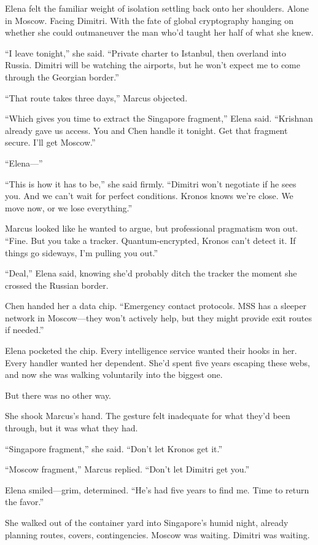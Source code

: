 \documentclass[12pt,letterpaper]{book}
\begin{document}
Elena felt the familiar weight of isolation settling back onto her shoulders. Alone in Moscow. Facing Dimitri. With the fate of global cryptography hanging on whether she could outmaneuver the man who'd taught her half of what she knew.

``I leave tonight,'' she said. ``Private charter to Istanbul, then overland into Russia. Dimitri will be watching the airports, but he won't expect me to come through the Georgian border.''

``That route takes three days,'' Marcus objected.

``Which gives you time to extract the Singapore fragment,'' Elena said. ``Krishnan already gave us access. You and Chen handle it tonight. Get that fragment secure. I'll get Moscow.''

``Elena---''

``This is how it has to be,'' she said firmly. ``Dimitri won't negotiate if he sees you. And we can't wait for perfect conditions. Kronos knows we're close. We move now, or we lose everything.''

Marcus looked like he wanted to argue, but professional pragmatism won out. ``Fine. But you take a tracker. Quantum-encrypted, Kronos can't detect it. If things go sideways, I'm pulling you out.''

``Deal,'' Elena said, knowing she'd probably ditch the tracker the moment she crossed the Russian border.

Chen handed her a data chip. ``Emergency contact protocols. MSS has a sleeper network in Moscow---they won't actively help, but they might provide exit routes if needed.''

Elena pocketed the chip. Every intelligence service wanted their hooks in her. Every handler wanted her dependent. She'd spent five years escaping these webs, and now she was walking voluntarily into the biggest one.

But there was no other way.

She shook Marcus's hand. The gesture felt inadequate for what they'd been through, but it was what they had.

``Singapore fragment,'' she said. ``Don't let Kronos get it.''

``Moscow fragment,'' Marcus replied. ``Don't let Dimitri get you.''

Elena smiled---grim, determined. ``He's had five years to find me. Time to return the favor.''

She walked out of the container yard into Singapore's humid night, already planning routes, covers, contingencies. Moscow was waiting. Dimitri was waiting.
\end{document}
